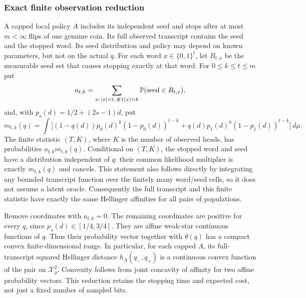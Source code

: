 \subsubsection*{Exact finite observation reduction}
A capped local policy $A$ includes its independent seed and stops after at
most $m<\infty$ flips of one genuine coin. Its full observed transcript
contains the seed and the stopped word. Its seed distribution and policy
may depend on known parameters, but not on the actual $q$.
For each word $x\in\{0,1\}^t$, let $B_{t,x}$ be the measurable seed set
that causes stopping exactly at that word. For $0\le k\le t\le m$ put
\[
 a_{t,k}=\sum_{x:\,|x|=t,\,\#1(x)=k}\mathbb P(\text{seed}\in B_{t,x}),
\]
and, with $p_s(d)=1/2+(2s-1)d$, put
\[
 m_{t,k}(q)=\int\big[(1-q(d))p_0(d)^k(1-p_0(d))^{t-k}
                  +q(d)p_1(d)^k(1-p_1(d))^{t-k}\big]\,d\mu.
\]
The finite statistic $(T,K)$, where $K$ is the number of observed heads,
has probabilities $a_{t,k}m_{t,k}(q)$. Conditional on $(T,K)$, the stopped
word and seed have a distribution independent of $q$: their common
likelihood multiplier is exactly $m_{t,k}(q)$ and cancels. This statement
also follows directly by integrating any bounded transcript function over
the finitely many word/seed cells, so it does not assume a latent oracle.
Consequently the full transcript and this finite statistic have exactly
the same Hellinger affinities for all pairs of populations.

Remove coordinates with $a_{t,k}=0$. The remaining coordinates are positive
for every $q$, since $p_s(d)\in[1/4,3/4]$. They are affine weak-star
continuous functions of $q$. Thus their probability vector together with
$\theta(q)$ has a compact convex finite-dimensional range. In particular,
for each capped $A$, its full-transcript squared Hellinger distance
$h_A(q_-,q_+)$ is a continuous convex function of the pair on
$\mathcal X_\rho^2$. Convexity follows from joint concavity of affinity for
two affine probability vectors. This reduction retains the stopping time
and expected cost, not just a fixed number of sampled bits.

